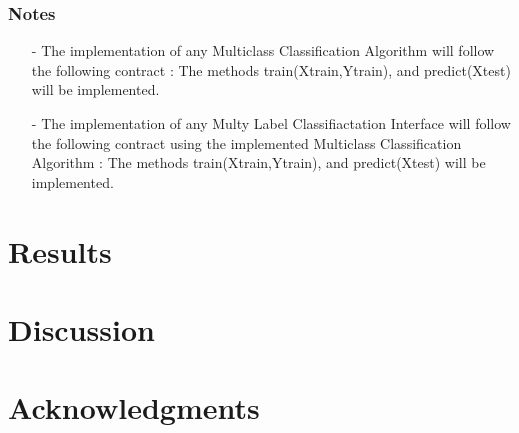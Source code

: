 \documentclass[10pt,letterpaper]{article}
\begin{document}
	\subsubsection*{Notes}
	\begin{itemize}
		\item[-] The implementation of any Multiclass Classification Algorithm will follow the following contract : The methods train(Xtrain,Ytrain), and predict(Xtest) will be implemented.
		
		\item[-] The implementation of any Multy Label Classifiactation Interface will follow the following contract using the implemented Multiclass Classification Algorithm  : The methods train(Xtrain,Ytrain), and predict(Xtest) will be implemented.

	\end{itemize}
	
	
	
	
	
	\newpage
	
	\section*{Results}

	\section*{Discussion}
	
	
\section*{Acknowledgments}




	
\end{document}
